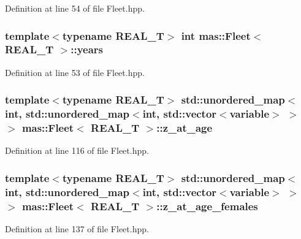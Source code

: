 Definition at line 54 of file Fleet.\-hpp.

\hypertarget{structmas_1_1_fleet_a823238fd7eb794d49a64743395bf1ae5}{
\subsubsection[{years}]{\setlength{\rightskip}{0pt plus 5cm}template$<$typename R\-E\-A\-L\-\_\-\-T$>$ int {\bf mas\-::\-Fleet}$<$ R\-E\-A\-L\-\_\-\-T $>$\-::years}}\label{structmas_1_1_fleet_a823238fd7eb794d49a64743395bf1ae5}


Definition at line 53 of file Fleet.\-hpp.

\hypertarget{structmas_1_1_fleet_a0bd290f2fba5bd5f00a1666673d77a3b}{
\subsubsection[{z\-\_\-at\-\_\-age}]{\setlength{\rightskip}{0pt plus 5cm}template$<$typename R\-E\-A\-L\-\_\-\-T$>$ std\-::unordered\-\_\-map$<$int, std\-::unordered\-\_\-map$<$int, std\-::vector$<${\bf variable}$>$ $>$ $>$ {\bf mas\-::\-Fleet}$<$ R\-E\-A\-L\-\_\-\-T $>$\-::z\-\_\-at\-\_\-age}}\label{structmas_1_1_fleet_a0bd290f2fba5bd5f00a1666673d77a3b}


Definition at line 116 of file Fleet.\-hpp.

\hypertarget{structmas_1_1_fleet_afb9df73617514f0606882e3ae2abb63c}{
\subsubsection[{z\-\_\-at\-\_\-age\-\_\-females}]{\setlength{\rightskip}{0pt plus 5cm}template$<$typename R\-E\-A\-L\-\_\-\-T$>$ std\-::unordered\-\_\-map$<$int, std\-::unordered\-\_\-map$<$int, std\-::vector$<${\bf variable}$>$ $>$ $>$ {\bf mas\-::\-Fleet}$<$ R\-E\-A\-L\-\_\-\-T $>$\-::z\-\_\-at\-\_\-age\-\_\-females}}\label{structmas_1_1_fleet_afb9df73617514f0606882e3ae2abb63c}


Definition at line 137 of file Fleet.\-hpp.

